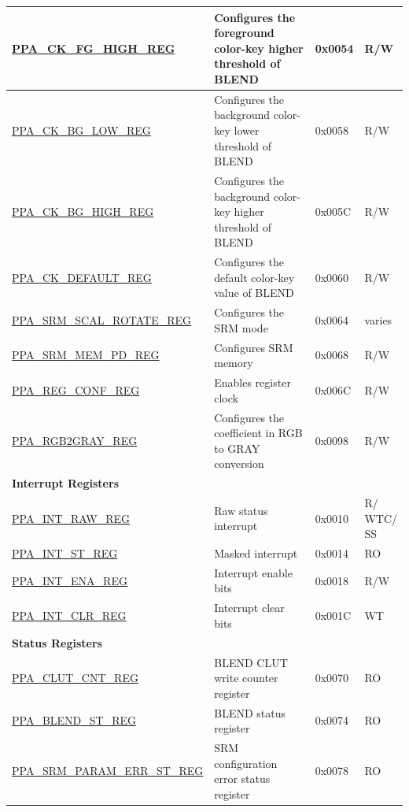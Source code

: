 \begin{longtable}{ | p{6cm} | p{7.2cm} | p{1.3cm} | p{1cm} | }
\hyperref[regdesc:PPACKFGHIGHREG]{PPA\_CK\_FG\_HIGH\_REG} & Configures the foreground color-key higher threshold of BLEND & 0x0054 & R/W \\ \hline
\hyperref[regdesc:PPACKBGLOWREG]{PPA\_CK\_BG\_LOW\_REG} & Configures the background color-key lower threshold of BLEND & 0x0058 & R/W \\ \hline
\hyperref[regdesc:PPACKBGHIGHREG]{PPA\_CK\_BG\_HIGH\_REG} & Configures the background color-key higher threshold of BLEND & 0x005C & R/W \\ \hline
\hyperref[regdesc:PPACKDEFAULTREG]{PPA\_CK\_DEFAULT\_REG} & Configures the default color-key value of BLEND & 0x0060 & R/W \\ \hline
\hyperref[regdesc:PPASRMSCALROTATEREG]{PPA\_SRM\_SCAL\_ROTATE\_REG} & Configures the SRM mode & 0x0064 & varies \\ \hline
\hyperref[regdesc:PPASRMMEMPDREG]{PPA\_SRM\_MEM\_PD\_REG} & Configures SRM memory & 0x0068 & R/W \\ \hline
\hyperref[regdesc:PPAREGCONFREG]{PPA\_REG\_CONF\_REG} & Enables register clock & 0x006C & R/W \\ \hline
\hyperref[regdesc:PPARGB2GRAYREG]{PPA\_RGB2GRAY\_REG} & Configures the coefficient in RGB to GRAY conversion & 0x0098 & R/W \\ \hline
\multicolumn{4}{|l|}{\textbf{Interrupt Registers}} \\ \hline
\hyperref[regdesc:PPAINTRAWREG]{PPA\_INT\_RAW\_REG} & Raw status interrupt & 0x0010 & \makecell[l]{R/\\WTC/\\SS} \\ \hline
\hyperref[regdesc:PPAINTSTREG]{PPA\_INT\_ST\_REG} & Masked interrupt & 0x0014 & RO \\ \hline
\hyperref[regdesc:PPAINTENAREG]{PPA\_INT\_ENA\_REG} & Interrupt enable bits & 0x0018 & R/W \\ \hline
\hyperref[regdesc:PPAINTCLRREG]{PPA\_INT\_CLR\_REG} & Interrupt clear bits & 0x001C & WT \\ \hline
\multicolumn{4}{|l|}{\textbf{Status Registers}} \\ \hline
\hyperref[regdesc:PPACLUTCNTREG]{PPA\_CLUT\_CNT\_REG} & BLEND CLUT write counter register & 0x0070 & RO \\ \hline
\hyperref[regdesc:PPABLENDSTREG]{PPA\_BLEND\_ST\_REG} & BLEND status register & 0x0074 & RO \\ \hline
\hyperref[regdesc:PPASRMPARAMERRSTREG]{PPA\_SRM\_PARAM\_ERR\_ST\_REG} & SRM configuration error status register & 0x0078 & RO \\ \hline

\end{longtable}
